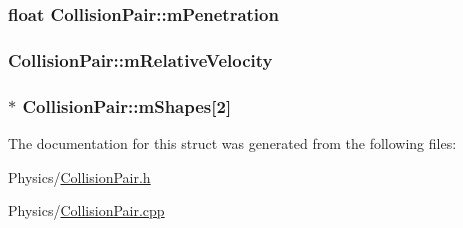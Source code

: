 \subsubsection[{\texorpdfstring{m\+Penetration}{mPenetration}}]{\setlength{\rightskip}{0pt plus 5cm}float Collision\+Pair\+::m\+Penetration}\hypertarget{structCollisionPair_ac83cb38a76dbbfae67c49e5e1da010b4}{}\label{structCollisionPair_ac83cb38a76dbbfae67c49e5e1da010b4}
\subsubsection[{\texorpdfstring{m\+Relative\+Velocity}{mRelativeVelocity}}]{ Collision\+Pair\+::m\+Relative\+Velocity}\hypertarget{structCollisionPair_a65c270e50cdf60e279a4f4a0ece62900}{}\label{structCollisionPair_a65c270e50cdf60e279a4f4a0ece62900}
\subsubsection[{\texorpdfstring{m\+Shapes}{mShapes}}]{$\ast$ Collision\+Pair\+::m\+Shapes\mbox{[}2\mbox{]}}\hypertarget{structCollisionPair_ac6db0c6dd34e89f672736c776c6fc648}{}\label{structCollisionPair_ac6db0c6dd34e89f672736c776c6fc648}


The documentation for this struct was generated from the following files\+:\begin{DoxyCompactItemize}
\item 
Physics/\hyperlink{CollisionPair_8h}{Collision\+Pair.\+h}\item 
Physics/\hyperlink{CollisionPair_8cpp}{Collision\+Pair.\+cpp}\end{DoxyCompactItemize}
